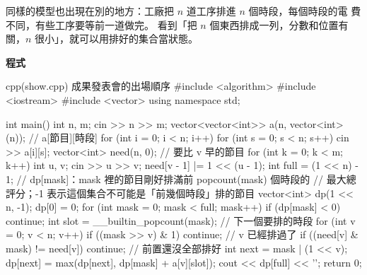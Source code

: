 \begin{center}
\end{center}

同樣的模型也出現在別的地方：工廠把 $n$ 道工序排進 $n$ 個時段，每個時段的電
費不同，有些工序要等前一道做完。 看到「把 $n$ 個東西排成一列，分數和位置有
關，$n$ 很小」，就可以用排好的集合當狀態。

\textbf{程式}

\begin{example}[label=ex:bm-show]{cpp}{(show.cpp) 成果發表會的出場順序}
#include <algorithm>
#include <iostream>
#include <vector>
using namespace std;

int main() {
    int n, m;
    cin >> n >> m;
    vector<vector<int>> a(n, vector<int>(n));    // a[節目][時段]
    for (int i = 0; i < n; i++) {
        for (int s = 0; s < n; s++) {
            cin >> a[i][s];
        }
    }
    vector<int> need(n, 0);                       // 要比 v 早的節目
    for (int k = 0; k < m; k++) {
        int u, v;
        cin >> u >> v;
        need[v - 1] |= 1 << (u - 1);
    }
    int full = (1 << n) - 1;
    // dp[mask]：mask 裡的節目剛好排滿前 popcount(mask) 個時段的
    // 最大總評分；-1 表示這個集合不可能是「前幾個時段」排的節目
    vector<int> dp(1 << n, -1);
    dp[0] = 0;
    for (int mask = 0; mask < full; mask++) {
        if (dp[mask] < 0) {
            continue;
        }
        int slot = __builtin_popcount(mask);      // 下一個要排的時段
        for (int v = 0; v < n; v++) {
            if ((mask >> v) & 1) {
                continue;                         // v 已經排過了
            }
            if ((need[v] & mask) != need[v]) {
                continue;                         // 前置還沒全部排好
            }
            int next = mask | (1 << v);
            dp[next] = max(dp[next], dp[mask] + a[v][slot]);
        }
    }
    cout << dp[full] << '\n';
    return 0;
}
\end{example}


